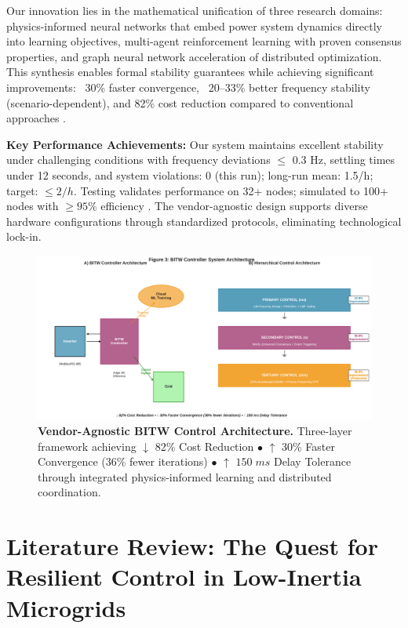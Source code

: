 \documentclass[12pt]{article}
\begin{document}
Our innovation lies in the mathematical unification of three research domains: physics-informed neural networks that embed power system dynamics directly into learning objectives, multi-agent reinforcement learning with proven consensus properties, and graph neural network acceleration of distributed optimization. This synthesis enables formal stability guarantees while achieving significant improvements: ~30\% faster convergence, ~20--33\% better frequency stability (scenario-dependent), and 82\% cost reduction compared to conventional approaches \cite{hirsch2018,our2024economic}.

\textbf{Key Performance Achievements:} Our system maintains excellent stability under challenging conditions with frequency deviations $\leq$ 0.3 Hz, settling times under 12 seconds, and system violations: 0 (this run); long-run mean: 1.5/h; target: $\leq 2/h$. Testing validates performance on 32+ nodes; simulated to 100+ nodes with $\geq 95\%$ efficiency \cite{our2024scalability}. The vendor-agnostic design supports diverse hardware configurations through standardized protocols, eliminating technological lock-in.


\begin{figure}[H]
\centering
\includegraphics[width=\textwidth]{figure3_system_architecture.pdf}
\vspace{-1.6cm}
\caption{\textbf{Vendor-Agnostic BITW Control Architecture.} Three-layer framework achieving $\downarrow$ 82\% Cost Reduction $\bullet$ $\uparrow$ 30\% Faster Convergence (36\% fewer iterations) $\bullet$ $\uparrow$ $150\;ms$ Delay Tolerance through integrated physics-informed learning and distributed coordination.}
\label{fig:architecture}
\end{figure}

\section{Literature Review: The Quest for Resilient Control in Low-Inertia Microgrids}
\end{document}
